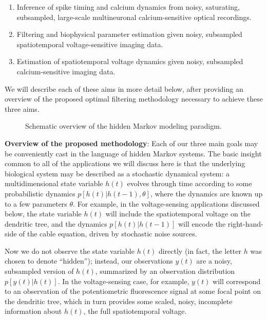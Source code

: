 \documentclass[12pt]{article}
\begin{document}
\begin{enumerate}
  
\item Inference of spike timing and calcium dynamics from noisy,
  saturating, subsampled, large-scale multineuronal calcium-sensitive
  optical recordings.

\item Filtering and biophysical parameter estimation given noisy,
  subsampled spatiotemporal voltage-sensitive imaging data.

\item Estimation of spatiotemporal voltage dynamics given noisy,
  subsampled calcium-sensitive imaging data.

\end{enumerate}

We will describe each of these aims in more detail below, after
providing an overview of the proposed optimal filtering methodology
necessary to achieve these three aims.



\begin{figure}[t!]
\begin{center}
\epsfxsize=3.5in
\caption{Schematic overview of the hidden Markov modeling paradigm.}
\label{fig:hmm-schematic}
\end{center}
\end{figure}

\noindent \textbf{Overview of the proposed methodology}: Each of our
three main goals may be conveniently cast in the language of hidden
Markov systems.  The basic insight common to all of the applications
we will discuss here is that the underlying biological system may be
described as a stochastic dynamical system: a multidimensional state
variable $h(t)$ evolves through time according to some probabilistic
dynamics $p[h(t)|h(t-1),\theta]$, where the dynamics are known up to a
few parameters $\theta$.  For example, in the voltage-sensing
applications discussed below, the state variable $h(t)$ will include
the spatiotemporal voltage on the dendritic tree, and the dynamics
$p[h(t)|h(t-1)]$ will encode the right-hand-side of the cable
equation, driven by stochastic noise sources.

Now we do not observe the state variable $h(t)$ directly (in fact, the
letter $h$ was chosen to denote ``hidden''); instead, our observations
$y(t)$ are a noisy, subsampled version of $h(t)$, summarized by an
observation distribution $p[y(t)|h(t)]$.  In the voltage-sensing case,
for example, $y(t)$ will correspond to an observation of the
potentiometric fluorescence signal at some focal point on the
dendritic tree, which in turn provides some scaled, noisy, incomplete
information about $h(t)$, the full spatiotemporal voltage.
\end{document}
